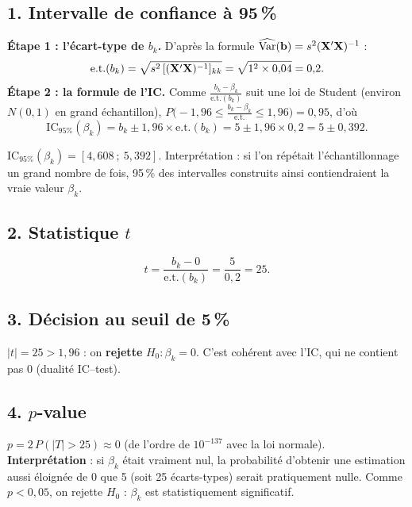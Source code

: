 \documentclass[11pt,a4paper]{article}
\begin{document}
\subsection*{1. Intervalle de confiance à 95\,\%}

\textbf{Étape 1 : l'écart-type de $b_k$.} D'après la formule $\widehat{\operatorname{Var}}(\mathbf{b})=s^2(\mathbf{X}'\mathbf{X})^{-1}$ :
\[
\text{e.t.}(b_k)=\sqrt{s^2\,[(\mathbf{X}'\mathbf{X})^{-1}]_{kk}}=\sqrt{1^2\times0{,}04}=0{,}2 .
\]
\textbf{Étape 2 : la formule de l'IC.} Comme $\frac{b_k-\beta_k}{\text{e.t.}(b_k)}$ suit une loi de Student (environ $N(0,1)$ en grand échantillon), $P\big(-1{,}96\le\frac{b_k-\beta_k}{\text{e.t.}}\le1{,}96\big)=0{,}95$, d'où
\[
\text{IC}_{95\%}(\beta_k)=b_k\pm1{,}96\times\text{e.t.}(b_k)=5\pm1{,}96\times0{,}2=5\pm0{,}392 .
\]

\begin{reponse}
$\text{IC}_{95\%}(\beta_k)=[4{,}608\ ;\ 5{,}392]$. Interprétation : si l'on répétait l'échantillonnage un grand nombre de fois, 95\,\% des intervalles construits ainsi contiendraient la vraie valeur $\beta_k$.
\end{reponse}

\subsection*{2. Statistique $t$}
\[
t=\frac{b_k-0}{\text{e.t.}(b_k)}=\frac{5}{0{,}2}=25 .
\]

\subsection*{3. Décision au seuil de 5\,\%}
\begin{reponse}
$|t|=25>1{,}96$ : on \textbf{rejette} $H_0:\beta_k=0$. C'est cohérent avec l'IC, qui ne contient pas 0 (dualité IC--test).
\end{reponse}

\subsection*{4. $p$-value}
\begin{reponse}
$p=2\,P(|T|>25)\approx0$ (de l'ordre de $10^{-137}$ avec la loi normale). \textbf{Interprétation} : si $\beta_k$ était vraiment nul, la probabilité d'obtenir une estimation aussi éloignée de 0 que 5 (soit 25 écarts-types) serait pratiquement nulle. Comme $p<0{,}05$, on rejette $H_0$ : $\beta_k$ est statistiquement significatif.
\end{reponse}
\end{document}
